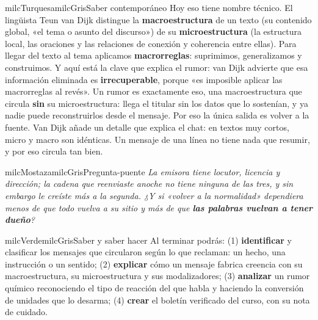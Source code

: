 \documentclass[11pt,letterpaper]{article}
\begin{document}
\begin{softbox}{milcTurquesa}{milcGris}{Saber contemporáneo}
Hoy eso tiene nombre técnico. El lingüista Teun van Dijk distingue la \textbf{macroestructura} de un texto (su contenido global, «el tema o asunto del discurso») de su \textbf{microestructura} (la estructura local, las oraciones y las relaciones de conexión y coherencia entre ellas). Para llegar del texto al tema aplicamos \textbf{macrorreglas}: suprimimos, generalizamos y construimos. Y aquí está la clave que explica el rumor: van Dijk advierte que esa información eliminada es \textbf{irrecuperable}, porque «es imposible aplicar las macrorreglas al revés». Un rumor es exactamente eso, una macroestructura que circula \textbf{sin} su microestructura: llega el titular sin los datos que lo sostenían, y ya nadie puede reconstruirlos desde el mensaje. Por eso la única salida es volver a la fuente. Van Dijk añade un detalle que explica el chat: en textos muy cortos, micro y macro son idénticas. Un mensaje de una línea no tiene nada que resumir, y por eso circula tan bien.
\end{softbox}

\begin{softbox}{milcMostaza}{milcGris}{Pregunta-puente}
\textit{La emisora tiene locutor, licencia y dirección; la cadena que reenviaste anoche no tiene ninguna de las tres, y sin embargo le creíste más a la segunda. ¿Y si «volver a la normalidad» dependiera menos de que todo vuelva a su sitio y más de que \textbf{las palabras vuelvan a tener dueño}?}
\end{softbox}

\begin{softbox}{milcVerde}{milcGris}{Saber y saber hacer}
Al terminar podrás: (1) \textbf{identificar} y clasificar los mensajes que circularon según lo que reclaman: un hecho, una instrucción o un sentido; (2) \textbf{explicar} cómo un mensaje fabrica creencia con su macroestructura, su microestructura y sus modalizadores; (3) \textbf{analizar} un rumor químico reconociendo el tipo de reacción del que habla y haciendo la conversión de unidades que lo desarma; (4) \textbf{crear} el boletín verificado del curso, con su nota de cuidado.
\end{softbox}
\end{document}
